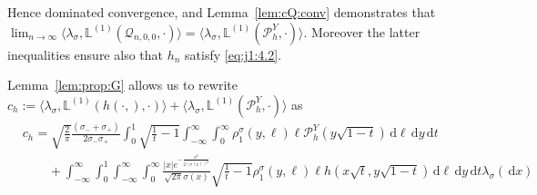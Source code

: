 \documentclass[12pt]{article}
\numberwithin{equation}{section}
\theoremstyle{definition}
\theoremstyle{remark}
\newcommand{\NN}{\mathbb{N}}
\newcommand{\RR}{\mathbb{R}}
\newcommand{\EE}{\mathbb{E}}
\newcommand{\cQ}{\mathcal{Q}}
\newcommand{\vd}{\,\mathrm{d}}
\newcommand{\Lm}[3]{\mathbb{L}^{(#2)}(#1,#3)}
\begin{document}
%
%
Hence dominated convergence, and Lemma~\ref{lem:cQ:conv} demonstrates that 
$\lim_{n\to\infty} \langle \lambda_\sigma , \Lm{\cQ_{n,0,0}}{1}{\cdot} \rangle 
= \langle \lambda_\sigma , \Lm{ \mathcal{P}_{h}^{Y} }{1}{\cdot} \rangle$.
Moreover 
the latter inequalities ensure also that 
$h_n$ 
satisfy \eqref{eq:j1:4.2}.

Lemma~\ref{lem:prop:G} allows us to rewrite
$c_h:= \langle \lambda_\sigma , \Lm{ h(\cdot,) }{1}{\cdot} \rangle + \langle \lambda_\sigma , \Lm{ \mathcal{P}_{h}^{Y} }{1}{\cdot} \rangle$ as
\begin{equation}\begin{split}	& c_h = \sqrt{\frac{2}{\pi}} \frac{(\sigma_- + \sigma_+)}{2\sigma_-\sigma_+}
			 \int_0^1  \sqrt{\frac{1}t-1}  \int_{-\infty}^\infty \int_0^\infty  \rho_1^\sigma(y,\ell) \ell \mathcal{P}_{h}^{Y} (y \sqrt{1-t}) \vd \ell \vd y \vd t
	\\
	& \qquad +
\int_{-\infty}^\infty \int_0^1 \int_{-\infty}^\infty \int_0^\infty 
\frac{|x| e^{-\frac{x^2}{2 (\sigma(x))^2}}}{\sqrt{2\pi}\sigma(x)}  \sqrt{\frac{1}t-1}  \rho_1^\sigma(y,\ell) \ell h(x \sqrt{t},y \sqrt{1-t})  
\vd \ell \vd y \vd t \lambda_\sigma(\!\vd x)
\end{split}\end{equation}
\end{document}
